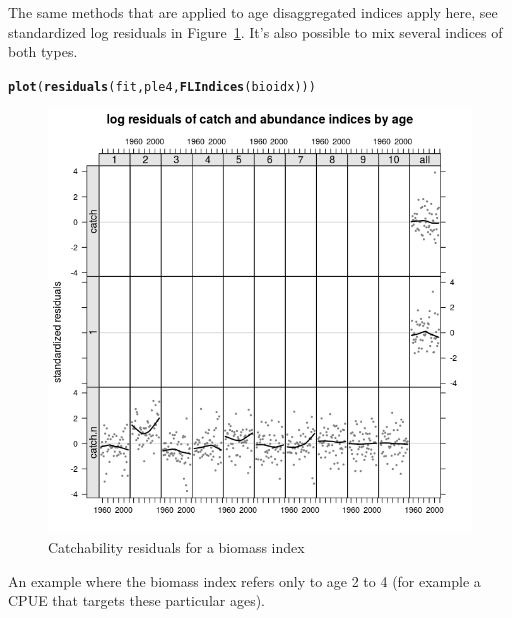 \documentclass[a4paper,english,10pt]{article}\usepackage[]{graphicx}\usepackage[]{color}
\makeatletter
\def\maxwidth{ %
  \ifdim\Gin@nat@width>\linewidth
    \linewidth
  \else
    \Gin@nat@width
  \fi
}
\newcommand{\hlstd}[1]{\textcolor[rgb]{0.345,0.345,0.345}{#1}}%
\newcommand{\hlkwd}[1]{\textcolor[rgb]{0.737,0.353,0.396}{\textbf{#1}}}%
\newenvironment{kframe}{%
 \def\at@end@of@kframe{}%
 \ifinner\ifhmode%
  \def\at@end@of@kframe{\end{minipage}}%
  \begin{minipage}{\columnwidth}%
 \fi\fi%
 \def\FrameCommand##1{\hskip\@totalleftmargin \hskip-\fboxsep
 \colorbox{shadecolor}{##1}\hskip-\fboxsep
     \hskip-\linewidth \hskip-\@totalleftmargin \hskip\columnwidth}%
 \MakeFramed {\advance\hsize-\width
   \@totalleftmargin\z@ \linewidth\hsize
   \@setminipage}}%
 {\par\unskip\endMakeFramed%
 \at@end@of@kframe}
\newenvironment{knitrout}{}{} %
\makeatother
\begin{document}
The same methods that are applied to age disaggregated indices apply here, see standardized log residuals in Figure~\ref{fig:resbio}. It's also possible to mix several indices of both types.

\begin{knitrout}
\color{fgcolor}\begin{kframe}
\begin{alltt}
\hlkwd{plot}\hlstd{(}\hlkwd{residuals}\hlstd{(fit, ple4,} \hlkwd{FLIndices}\hlstd{(bioidx)))}
\end{alltt}
\end{kframe}\begin{figure}[H]

{\centering \includegraphics[width=\maxwidth]{figure/resbio-1} 

}

\caption[Catchability residuals for a biomass index]{Catchability residuals for a biomass index}\label{fig:resbio}
\end{figure}


\end{knitrout}

An example where the biomass index refers only to age 2 to 4 (for example a CPUE that targets these particular ages).
\end{document}
